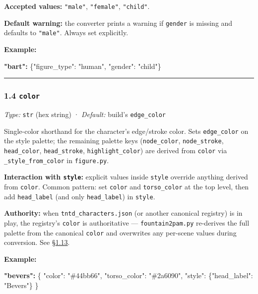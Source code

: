 \documentclass[
  12pt,
  letterpaper,
]{book}
\newenvironment{Shaded}{}{}
\newcommand{\DataTypeTok}[1]{\textcolor[rgb]{0.56,0.13,0.00}{#1}}
\newcommand{\ErrorTok}[1]{\textcolor[rgb]{1.00,0.00,0.00}{\textbf{#1}}}
\newcommand{\FunctionTok}[1]{\textcolor[rgb]{0.02,0.16,0.49}{#1}}
\newcommand{\StringTok}[1]{\textcolor[rgb]{0.25,0.44,0.63}{#1}}
\begin{document}
\textbf{Accepted values:} \texttt{"male"}, \texttt{"female"},
\texttt{"child"}.

\textbf{Default warning:} the converter prints a warning if
\texttt{gender} is missing and defaults to \texttt{"male"}. Always set
explicitly.

\textbf{Example:}

\begin{Shaded}
\begin{Highlighting}[]
\ErrorTok{"bart":} \FunctionTok{\{}\DataTypeTok{"figure\_type"}\FunctionTok{:} \StringTok{"human"}\FunctionTok{,} \DataTypeTok{"gender"}\FunctionTok{:} \StringTok{"child"}\FunctionTok{\}}
\end{Highlighting}
\end{Shaded}

\begin{center}\rule{0.5\linewidth}{0.5pt}\end{center}

\subsubsection{\texorpdfstring{1.4
\texttt{color}}{1.4 color}}\label{color}

\emph{Type:} \texttt{str} (hex string) · \emph{Default:} build's
\texttt{edge\_color}

Single-color shorthand for the character's edge/stroke color. Sets
\texttt{edge\_color} on the style palette; the remaining palette keys
(\texttt{node\_color}, \texttt{node\_stroke}, \texttt{head\_color},
\texttt{head\_stroke}, \texttt{highlight\_color}) are derived from
\texttt{color} via \texttt{\_style\_from\_color} in \texttt{figure.py}.

\textbf{Interaction with \texttt{style}:} explicit values inside
\texttt{style} override anything derived from \texttt{color}. Common
pattern: set \texttt{color} and \texttt{torso\_color} at the top level,
then add \texttt{head\_label} (and only \texttt{head\_label}) in
\texttt{style}.

\textbf{Authority:} when \texttt{tntd\_characters.json} (or another
canonical registry) is in play, the registry's \texttt{color} is
authoritative --- \texttt{fountain2pam.py} re-derives the full palette
from the canonical \texttt{color} and overwrites any per-scene values
during conversion. See
\hyperref[113-field-precedence-and-the-canonical-registry]{§1.13}.

\textbf{Example:}

\begin{Shaded}
\begin{Highlighting}[]
\ErrorTok{"bevers":} \FunctionTok{\{}
  \DataTypeTok{"color"}\FunctionTok{:} \StringTok{"\#44bb66"}\FunctionTok{,}
  \DataTypeTok{"torso\_color"}\FunctionTok{:} \StringTok{"\#2a6090"}\FunctionTok{,}
  \DataTypeTok{"style"}\FunctionTok{:} \FunctionTok{\{}\DataTypeTok{"head\_label"}\FunctionTok{:} \StringTok{"Bevers"}\FunctionTok{\}}
\FunctionTok{\}}
\end{Highlighting}
\end{Shaded}
\end{document}
